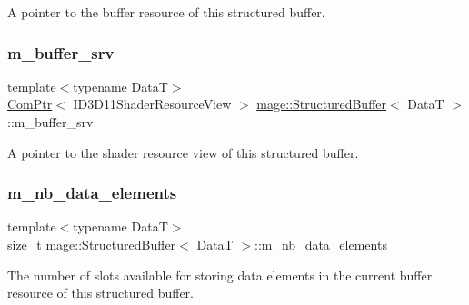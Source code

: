 A pointer to the buffer resource of this structured buffer. \hypertarget{structmage_1_1_structured_buffer_a94f811f1d36cf63dad600e6f89dcc40b}{}\label{structmage_1_1_structured_buffer_a94f811f1d36cf63dad600e6f89dcc40b} 
\subsubsection{\texorpdfstring{m\+\_\+buffer\+\_\+srv}{m\_buffer\_srv}}
{\footnotesize\ttfamily template$<$typename DataT$>$ \\
\hyperlink{namespacemage_ae74f374780900893caa5555d1031fd79}{Com\+Ptr}$<$ I\+D3\+D11\+Shader\+Resource\+View $>$ \hyperlink{structmage_1_1_structured_buffer}{mage\+::\+Structured\+Buffer}$<$ DataT $>$\+::m\+\_\+buffer\+\_\+srv\hspace{0.3cm}{\ttfamily [private]}}

A pointer to the shader resource view of this structured buffer. \hypertarget{structmage_1_1_structured_buffer_a92c53203287f6ef5ab8ed88c7b588e72}{}\label{structmage_1_1_structured_buffer_a92c53203287f6ef5ab8ed88c7b588e72} 
\subsubsection{\texorpdfstring{m\+\_\+nb\+\_\+data\+\_\+elements}{m\_nb\_data\_elements}}
{\footnotesize\ttfamily template$<$typename DataT$>$ \\
size\+\_\+t \hyperlink{structmage_1_1_structured_buffer}{mage\+::\+Structured\+Buffer}$<$ DataT $>$\+::m\+\_\+nb\+\_\+data\+\_\+elements\hspace{0.3cm}{\ttfamily [private]}}

The number of slots available for storing data elements in the current buffer resource of this structured buffer. \hypertarget{structmage_1_1_structured_buffer_a8c69058d2ce956c7c1690a45e1bffb34}{}\label{structmage_1_1_structured_buffer_a8c69058d2ce956c7c1690a45e1bffb34} 
